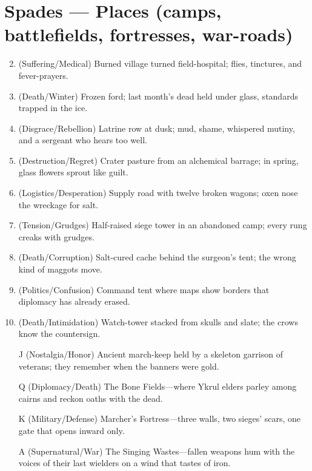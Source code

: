 \section*{Spades --- Places (camps, battlefields, fortresses, war-roads)}
\label{sec:black-banners-places}
\begin{enumerate}
\setcounter{enumi}{1}
\item (Suffering/Medical) Burned village turned field-hospital; flies, tinctures, and fever-prayers.
\item (Death/Winter) Frozen ford; last month's dead held under glass, standards trapped in the ice.
\item (Disgrace/Rebellion) Latrine row at dusk; mud, shame, whispered mutiny, and a sergeant who hears too well.
\item (Destruction/Regret) Crater pasture from an alchemical barrage; in spring, glass flowers sprout like guilt.
\item (Logistics/Desperation) Supply road with twelve broken wagons; oxen nose the wreckage for salt.
\item (Tension/Grudges) Half-raised siege tower in an abandoned camp; every rung creaks with grudges.
\item (Death/Corruption) Salt-cured cache behind the surgeon's tent; the wrong kind of maggots move.
\item (Politics/Confusion) Command tent where maps show borders that diplomacy has already erased.
\item (Death/Intimidation) Watch-tower stacked from skulls and slate; the crows know the countersign.
\item[J] (Nostalgia/Honor) Ancient march-keep held by a skeleton garrison of veterans; they remember when the banners were gold.
\item[Q] (Diplomacy/Death) The Bone Fields---where Ykrul elders parley among cairns and reckon oaths with the dead.
\item[K] (Military/Defense) Marcher's Fortress---three walls, two sieges' scars, one gate that opens inward only.
\item[A] (Supernatural/War) The Singing Wastes---fallen weapons hum with the voices of their last wielders on a wind that tastes of iron.
\end{enumerate}


